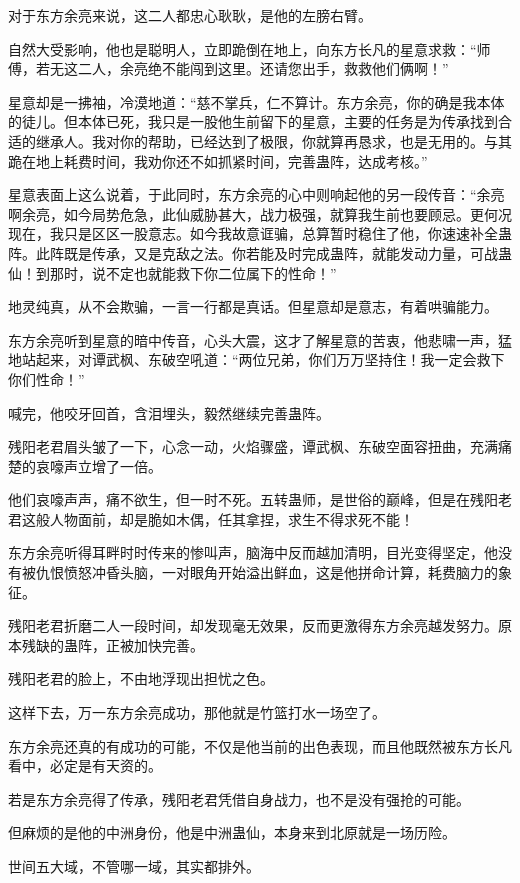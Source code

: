 \begin{this_body}
对于东方余亮来说，这二人都忠心耿耿，是他的左膀右臂。

自然大受影响，他也是聪明人，立即跪倒在地上，向东方长凡的星意求救：“师傅，若无这二人，余亮绝不能闯到这里。还请您出手，救救他们俩啊！”

星意却是一拂袖，冷漠地道：“慈不掌兵，仁不算计。东方余亮，你的确是我本体的徒儿。但本体已死，我只是一股他生前留下的星意，主要的任务是为传承找到合适的继承人。我对你的帮助，已经达到了极限，你就算再恳求，也是无用的。与其跪在地上耗费时间，我劝你还不如抓紧时间，完善蛊阵，达成考核。”

星意表面上这么说着，于此同时，东方余亮的心中则响起他的另一段传音：“余亮啊余亮，如今局势危急，此仙威胁甚大，战力极强，就算我生前也要顾忌。更何况现在，我只是区区一股意志。如今我故意诓骗，总算暂时稳住了他，你速速补全蛊阵。此阵既是传承，又是克敌之法。你若能及时完成蛊阵，就能发动力量，可战蛊仙！到那时，说不定也就能救下你二位属下的性命！”

地灵纯真，从不会欺骗，一言一行都是真话。但星意却是意志，有着哄骗能力。

东方余亮听到星意的暗中传音，心头大震，这才了解星意的苦衷，他悲啸一声，猛地站起来，对谭武枫、东破空吼道：“两位兄弟，你们万万坚持住！我一定会救下你们性命！”

喊完，他咬牙回首，含泪埋头，毅然继续完善蛊阵。

残阳老君眉头皱了一下，心念一动，火焰骤盛，谭武枫、东破空面容扭曲，充满痛楚的哀嚎声立增了一倍。

他们哀嚎声声，痛不欲生，但一时不死。五转蛊师，是世俗的巅峰，但是在残阳老君这般人物面前，却是脆如木偶，任其拿捏，求生不得求死不能！

东方余亮听得耳畔时时传来的惨叫声，脑海中反而越加清明，目光变得坚定，他没有被仇恨愤怒冲昏头脑，一对眼角开始溢出鲜血，这是他拼命计算，耗费脑力的象征。

残阳老君折磨二人一段时间，却发现毫无效果，反而更激得东方余亮越发努力。原本残缺的蛊阵，正被加快完善。

残阳老君的脸上，不由地浮现出担忧之色。

这样下去，万一东方余亮成功，那他就是竹篮打水一场空了。

东方余亮还真的有成功的可能，不仅是他当前的出色表现，而且他既然被东方长凡看中，必定是有天资的。

若是东方余亮得了传承，残阳老君凭借自身战力，也不是没有强抢的可能。

但麻烦的是他的中洲身份，他是中洲蛊仙，本身来到北原就是一场历险。

世间五大域，不管哪一域，其实都排外。


\end{this_body}
